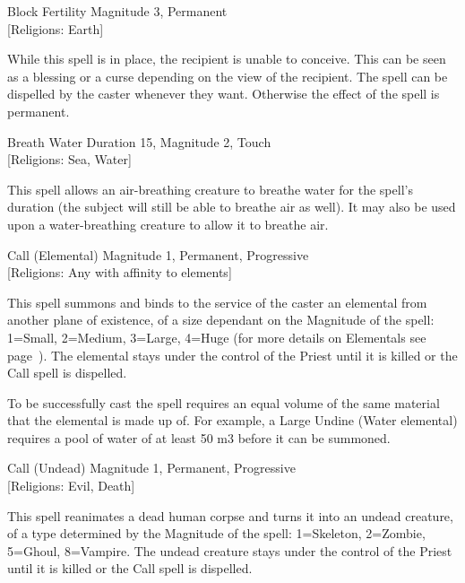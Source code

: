\begin{rpg-spell}
{Block Fertility}
{Magnitude 3, Permanent\\{[Religions: Earth]}}

While this spell is in place, the recipient is unable to conceive. This can be seen as a blessing or a curse depending on the view of the recipient. The spell can be dispelled by the caster whenever they want. Otherwise the effect of the spell is permanent. 
\end{rpg-spell}

\begin{rpg-spell}
{Breath Water}
{Duration 15, Magnitude 2, Touch\\{[Religions: Sea, Water]}}

This spell allows an air-breathing creature to breathe water for the spell’s duration (the subject will still be able to breathe air as well). It may also be used upon a water-breathing creature to allow it to breathe air. 
\end{rpg-spell}

\begin{rpg-spell}
{Call (Elemental)}
{Magnitude 1, Permanent, Progressive\\{[Religions: Any with affinity to elements]}}

This spell summons and binds to the service of the caster an elemental from another plane of existence, of a size dependant on the Magnitude of the spell:
1=Small, 2=Medium, 3=Large, 4=Huge (for more details on Elementals see page~\pageref{monster:elemental}). The elemental stays under the control of the Priest until it is killed or the Call spell is dispelled. 
	
To be successfully cast the spell requires an equal volume of the same material that the elemental is made up of. For example, a Large Undine (Water elemental) requires a pool of water of at least 50 m3 before it can be summoned.
\end{rpg-spell}

\begin{rpg-spell}
{Call (Undead)}
{Magnitude 1, Permanent, Progressive\\{[Religions: Evil, Death]}}

This spell reanimates a dead human corpse and turns it into an undead creature, of a type determined by the Magnitude of the spell:
1=Skeleton, 2=Zombie, 5=Ghoul, 8=Vampire. The undead creature stays under the control of the Priest until it is killed or the Call spell is dispelled.
\end{rpg-spell}

